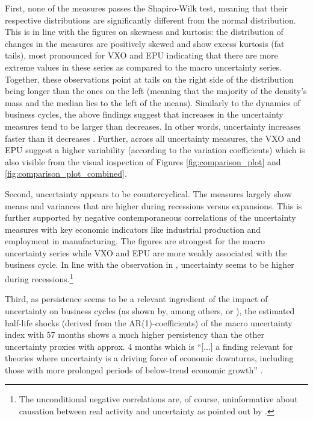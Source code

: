 \documentclass[a4paper,11pt,listof=nochaptergap,oneside,pointednumbers,bibtotoc,bigheadings,liststotoc,hidelinks]{scrbook}
\theoremstyle{mysatz}
\theoremstyle{mydefinition}
\theoremstyle{mytheorem}
\theoremstyle{mybemerkung}
\begin{document}
First, none of the measures passes the Shapiro-Wilk test, meaning that their respective distributions are significantly different from the normal distribution. This is in line with the figures on skewness and kurtosis: the distribution of changes in the measures are positively skewed and show excess kurtosis (fat tails), most pronounced for VXO and EPU indicating that there are more extreme values in these series as compared to the macro uncertainty series. Together, these observations point at tails on the right side of the distribution being longer than the ones on the left (meaning that the majority of the density's mass and the median lies to the left of the means). Similarly to the dynamics of business cycles, the above findings suggest that increases in the uncertainty measures tend to be larger than decreases. In other words, uncertainty increases faster than it decreases \citep{moore:17}. Further, across all uncertainty measures, the VXO and EPU suggest a higher variability (according to the variation coefficients) which is also visible from the visual inspection of Figures \ref{fig:comparison_plot} and \ref{fig:comparison_plot_combined}.

Second, uncertainty appears to be countercyclical. The measures largely show means and variances that are higher during recessions versus expansions. This is further supported by negative contemporaneous correlations of the uncertainty measures with key economic indicators like industrial production and employment in manufacturing. The figures are strongest for the macro uncertainty series while VXO and EPU are more weakly associated with the business cycle. In line with the observation in \citet{bloom:14}, uncertainty seems to be higher during recessions.\footnote{The unconditional negative correlations are, of course, uninformative about causation between real activity and uncertainty as pointed out by \citet{juradoetal:15}.}


Third, as persistence seems to be a relevant ingredient of the impact of uncertainty on business cycles (as shown by, among others, \citet{schaal:17} or \citet{juradoetal:15}), the estimated half-life shocks (derived from the AR(1)-coefficients) of the macro uncertainty index with 57 months shows a much higher persistency than the other uncertainty proxies with approx. 4 months which is ``[...] a finding relevant for theories where uncertainty is a driving force of economic downturns, including those with more prolonged periods of below-trend economic growth'' \citep[p. 1193]{juradoetal:15}. 
\end{document}
